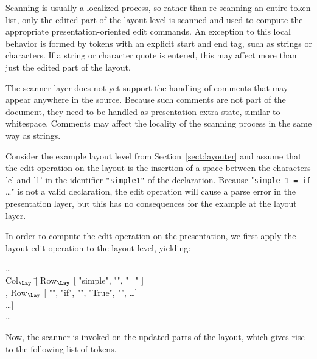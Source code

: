 Scanning is usually a localized process, so rather than re-scanning an entire token list, only the edited part of the layout level is scanned and used to compute the appropriate presentation-oriented edit commands. An exception to this local behavior is formed by tokens with an explicit start and end tag, such as strings or characters. If a string or character quote is entered, this may affect more than just the edited part of the layout.

The scanner layer does not yet support the handling of comments that may appear anywhere in the source. Because such comments are not part of the document, they need to be handled as presentation extra state, similar to whitespace. Comments may affect the locality of the scanning process in the same way as strings.


Consider the example layout level from Section~\ref{sect:layouter} and assume that the edit operation on the layout is the insertion of a space between the characters 'e' and '1' in the identifier \verb|"simple1"| of the declaration. Because "\verb|simple 1 = if |\dots" is not a valid declaration, the edit operation will cause a parse error in the presentation layer, but this has no consequences for the example at the layout layer.

In order to compute the edit operation on the presentation, we first apply the layout edit operation to the layout level, yielding:

\small \ttfamily
\begin{tabbing}
\dots\\
Col$_{\Lay}$ \= [ Row$_{\Lay}$ [ "simple", "\textvisiblespace", "=" ]\\
                   \> , Row$_{\Lay}$ [ "\textvisiblespace\textvisiblespace", 
                                                 "if", "\textvisiblespace", "True", "\textvisiblespace", \dots ] \\
                   \> \dots ]\\
\dots
\end{tabbing}
\rmfamily \normalsize

Now, the scanner is invoked on the updated parts of the layout, which gives rise to the following list of tokens.

